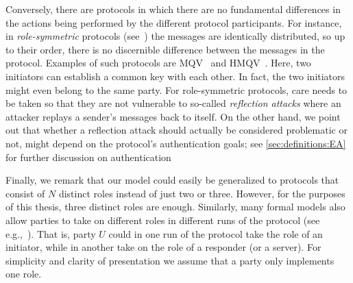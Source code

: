 Conversely,
there are protocols in which there are no fundamental differences in the actions being performed by the different protocol participants.
For instance,
in \emph{role-symmetric} protocols (see~\cite{EPRINT:Cremers09,ASIACCS:Cremers11}) the messages are identically distributed,
so up to their order,
there is no discernible difference between the messages in the protocol. 
Examples of such protocols are MQV~\cite{LawMQSV:2003:MQV} and HMQV~\cite{C:Krawczyk05}.
Here,
two initiators can establish a common key with each other.
In fact,
the two initiators might even belong to the same party.
For role-symmetric protocols,
care needs to be taken so that they are not vulnerable to so-called \emph{reflection attacks} \cite{DBLP:conf/esorics/Cremers11}
where an attacker replays a sender's messages back to itself.
On the other hand,
we point out that whether a reflection attack should actually be considered problematic or not,
might depend on the protocol's authentication goals;
see \cref{sec:definitions:EA} for further discussion on authentication
%


Finally,
we remark that our model could easily be generalized to protocols that consist of $N$ distinct roles instead of just two or three.
However,
for the purposes of this thesis,
three distinct roles are enough. 
Similarly,
many formal models also allow parties to take on different roles in different runs of the protocol
(see e.g.,~\cite{C:JKSS12}).
That is,
party $U$ could in one run of the protocol take the role of an initiator,
while in another take on the role of a responder (or a server).
For simplicity and clarity of presentation we assume that a party only implements one role.  




